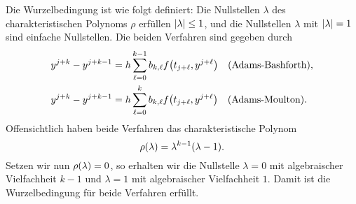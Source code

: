 \documentclass{exercise}
\begin{document}
    Die Wurzelbedingung ist wie folgt definiert:
    Die Nullstellen \(\lambda\) des charakteristischen Polynoms \(\rho\) erfüllen \(\absolute*{\lambda} \le 1\), und die Nullstellen \(\lambda\) mit \(\absolute*{\lambda} = 1\) sind einfache Nullstellen.
    Die beiden Verfahren sind gegeben durch
    \begin{align*}
        y^{j + k} - y^{j + k - 1} &= h\sum_{\ell = 0}^{k - 1}b_{k, \ell}f\parentheses*{t_{j + \ell}, y^{j + \ell}} \quad \text{(Adams-Bashforth)},\\
        y^{j + k} - y^{j + k - 1} &= h\sum_{\ell = 0}^k b_{k, \ell}f\parentheses*{t_{j + \ell}, y^{j + \ell}} \quad \text{(Adams-Moulton)}.
    \end{align*}
    Offensichtlich haben beide Verfahren das charakteristische Polynom
    \[
        \rho\parentheses*{\lambda} = \lambda^{k - 1}\parentheses*{\lambda - 1}.
    \]
    Setzen wir nun \(\rho\parentheses*{\lambda} = 0\), so erhalten wir die Nullstelle \(\lambda = 0\) mit algebraischer Vielfachheit \(k - 1\) und \(\lambda = 1\) mit algebraischer Vielfachheit \(1\). Damit ist die Wurzelbedingung für beide Verfahren erfüllt.

    
    \section{}
    
\end{document}
